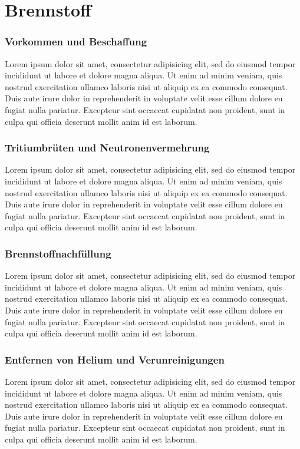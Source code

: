 \documentclass[aspectratio=169]{beamer}
\begin{document}
  \section{Brennstoff}

    \begin{frame}
      \frametitle{Vorkommen und Beschaffung}
      Lorem ipsum dolor sit amet, consectetur adipisicing elit, sed do eiusmod tempor incididunt ut labore et dolore magna aliqua. Ut enim ad minim veniam, quis nostrud exercitation ullamco laboris nisi ut aliquip ex ea commodo consequat. Duis aute irure dolor in reprehenderit in voluptate velit esse cillum dolore eu fugiat nulla pariatur. Excepteur sint occaecat cupidatat non proident, sunt in culpa qui officia deserunt mollit anim id est laborum.
    \end{frame}

    \begin{frame}
      \frametitle{Tritiumbrüten und Neutronenvermehrung}
      Lorem ipsum dolor sit amet, consectetur adipisicing elit, sed do eiusmod tempor incididunt ut labore et dolore magna aliqua. Ut enim ad minim veniam, quis nostrud exercitation ullamco laboris nisi ut aliquip ex ea commodo consequat. Duis aute irure dolor in reprehenderit in voluptate velit esse cillum dolore eu fugiat nulla pariatur. Excepteur sint occaecat cupidatat non proident, sunt in culpa qui officia deserunt mollit anim id est laborum.
    \end{frame}

    \begin{frame}
      \frametitle{Brennstoffnachfüllung}
      Lorem ipsum dolor sit amet, consectetur adipisicing elit, sed do eiusmod tempor incididunt ut labore et dolore magna aliqua. Ut enim ad minim veniam, quis nostrud exercitation ullamco laboris nisi ut aliquip ex ea commodo consequat. Duis aute irure dolor in reprehenderit in voluptate velit esse cillum dolore eu fugiat nulla pariatur. Excepteur sint occaecat cupidatat non proident, sunt in culpa qui officia deserunt mollit anim id est laborum.
    \end{frame}

    \begin{frame}
      \frametitle{Entfernen von Helium und Verunreinigungen}
      Lorem ipsum dolor sit amet, consectetur adipisicing elit, sed do eiusmod tempor incididunt ut labore et dolore magna aliqua. Ut enim ad minim veniam, quis nostrud exercitation ullamco laboris nisi ut aliquip ex ea commodo consequat. Duis aute irure dolor in reprehenderit in voluptate velit esse cillum dolore eu fugiat nulla pariatur. Excepteur sint occaecat cupidatat non proident, sunt in culpa qui officia deserunt mollit anim id est laborum.
    \end{frame}
\end{document}
